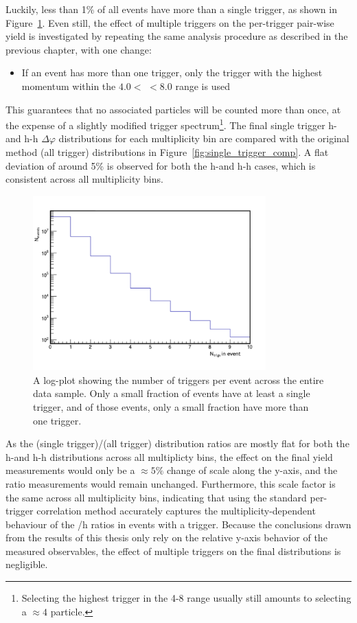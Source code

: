 Luckily, less than 1\% of all events have more than a single trigger, as shown in Figure~\ref{fig:trigs_per_event}. Even still, the effect of multiple triggers on the per-trigger pair-wise yield is investigated by repeating the same analysis procedure as described in the previous chapter, with one change:
%
\begin{itemize}
    \item If an event has more than one trigger, only the trigger with the highest momentum within the $4.0 <$ \pt $< 8.0$ \GeVc range is used
\end{itemize}
%
This guarantees that no associated particles will be counted more than once, at the expense of a slightly modified trigger \pt spectrum\footnote{Selecting the highest \pt trigger in the 4-8 \GeVc range usually still amounts to selecting a $\approx 4$ \GeVc particle.}. The final single trigger h-\lmb and h-h $\Delta\varphi$ distributions for each multiplicity bin are compared with the original method (all trigger) distributions in Figure~\ref{fig:single_trigger_comp}. A flat deviation of around 5\% is observed for both the h-\lmb and h-h cases, which is consistent across all multiplicity bins.

\begin{figure}[ht!]
    \centering
    \includegraphics[width=0.8\textwidth]{figures/analysis/trig_per_event.pdf}
    \caption{A log-plot showing the number of triggers per event across the entire data sample. Only a small fraction of events have at least a single trigger, and of those events, only a small fraction have more than one trigger.}
    \label{fig:trigs_per_event}
\end{figure}

As the (single trigger)/(all trigger) distribution ratios are mostly flat for both the h-\lmb and h-h distributions across all multiplicty bins, the effect on the final yield measurements would only be a $\approx 5\%$ change of scale along the y-axis, and the ratio measurements would remain unchanged. Furthermore, this scale factor is the same across all multiplicity bins, indicating that using the standard per-trigger correlation method accurately captures the multiplicity-dependent behaviour of the \lmb/h ratios in events with a trigger. Because the conclusions drawn from the results of this thesis only rely on the relative y-axis behavior of the measured observables, the effect of multiple triggers on the final distributions is negligible.


